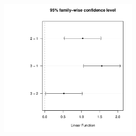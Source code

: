 \begin{problem}
\begin{enumerate}
\begin{center}
  \includegraphics[width=7cm]{./ch_07a_inference_for_means_oi_biostat/figures/eoce/tema7-6}
\end{center}

\end{enumerate}

\end{problem}

